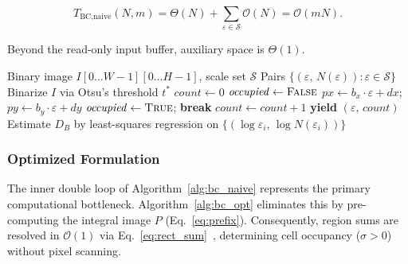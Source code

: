 \begin{equation}
  T_{\text{BC,naive}}(N,m)
    = \Theta(N) + \sum_{\varepsilon \in \mathcal{S}}
      \mathcal{O}(N)
    = \mathcal{O}(mN).
  \label{eq:bc_naive_time}
\end{equation}

Beyond the read-only input buffer, auxiliary space is $\Theta(1)$.

\begin{algorithm}[t]
\caption{Naive Classical Box-Counting}
\label{alg:bc_naive}
\begin{algorithmic}[1]
\Require Binary image $I[0\ldots W{-}1][0\ldots H{-}1]$, scale set $\mathcal{S}$
\Ensure Pairs $\{(\varepsilon,\, N(\varepsilon)) : \varepsilon \in \mathcal{S}\}$
\State Binarize $I$ via Otsu's threshold $t^{*}$ \cite{Otsu1979}
  \State $\mathit{count} \leftarrow 0$
      \State $\mathit{occupied} \leftarrow \textsc{False}$
          \State $px \leftarrow b_x \cdot \varepsilon + dx$;\; $py \leftarrow b_y \cdot \varepsilon + dy$
            \State $\mathit{occupied} \leftarrow \textsc{True}$;\; \textbf{break}
          \EndIf
        \EndFor
      \EndFor
        \State $\mathit{count} \leftarrow \mathit{count} + 1$
      \EndIf
    \EndFor
  \EndFor
  \State \textbf{yield} $(\varepsilon,\, \mathit{count})$
\EndFor
\State Estimate $D_B$ by least-squares regression on $\{(\log \varepsilon_i,\, \log N(\varepsilon_i))\}$
\end{algorithmic}
\end{algorithm}

\subsubsection{Optimized Formulation}

The inner double loop of Algorithm~\ref{alg:bc_naive} represents the primary computational bottleneck. Algorithm~\ref{alg:bc_opt} eliminates this by pre-computing the integral image $P$ (Eq.~\eqref{eq:prefix}). Consequently, region sums are resolved in $\mathcal{O}(1)$ via Eq.~\eqref{eq:rect_sum}~\cite{Crow1984}, determining cell occupancy ($\sigma > 0$) without pixel scanning.

